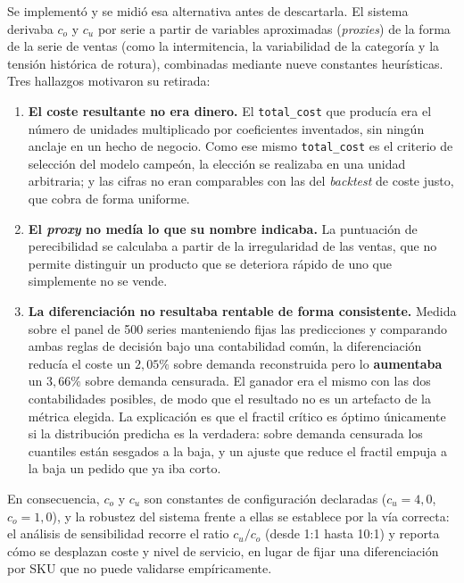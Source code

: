 Se implementó y se midió esa alternativa antes de descartarla. El sistema derivaba $c_o$ y $c_u$ por serie a partir de variables aproximadas (\textit{proxies}) de la forma de la serie de ventas (como la intermitencia, la variabilidad de la categoría y la tensión histórica de rotura), combinadas mediante nueve constantes heurísticas. Tres hallazgos motivaron su retirada:

\begin{enumerate}
    \item \textbf{El coste resultante no era dinero.} El \texttt{total\_cost} que producía era el número de unidades multiplicado por coeficientes inventados, sin ningún anclaje en un hecho de negocio. Como ese mismo \texttt{total\_cost} es el criterio de selección del modelo campeón, la elección se realizaba en una unidad arbitraria; y las cifras no eran comparables con las del \textit{backtest} de coste justo, que cobra de forma uniforme.

    \item \textbf{El \textit{proxy} no medía lo que su nombre indicaba.} La puntuación de perecibilidad se calculaba a partir de la irregularidad de las ventas, que no permite distinguir un producto que se deteriora rápido de uno que simplemente no se vende.

    \item \textbf{La diferenciación no resultaba rentable de forma consistente.} Medida sobre el panel de 500 series manteniendo fijas las predicciones y comparando ambas reglas de decisión bajo una contabilidad común, la diferenciación reducía el coste un $2{,}05\%$ sobre demanda reconstruida pero lo \textbf{aumentaba} un $3{,}66\%$ sobre demanda censurada. El ganador era el mismo con las dos contabilidades posibles, de modo que el resultado no es un artefacto de la métrica elegida. La explicación es que el fractil crítico es óptimo únicamente si la distribución predicha es la verdadera: sobre demanda censurada los cuantiles están sesgados a la baja, y un ajuste que reduce el fractil empuja a la baja un pedido que ya iba corto.
\end{enumerate}

En consecuencia, $c_o$ y $c_u$ son constantes de configuración declaradas ($c_u = 4{,}0$, $c_o = 1{,}0$), y la robustez del sistema frente a ellas se establece por la vía correcta: el análisis de sensibilidad recorre el ratio $c_u/c_o$ (desde 1:1 hasta 10:1) y reporta cómo se desplazan coste y nivel de servicio, en lugar de fijar una diferenciación por SKU que no puede validarse empíricamente.

